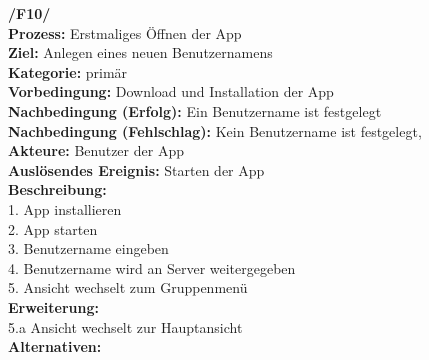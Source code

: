 \textbf{/F10/} \\
\textbf{Prozess:} Erstmaliges Öffnen der App \\
\textbf{Ziel:} Anlegen eines neuen Benutzernamens \\
\textbf{Kategorie:} primär \\
\textbf{Vorbedingung:} Download und Installation der App \\
\textbf{Nachbedingung (Erfolg):} Ein Benutzername ist festgelegt \\
\textbf{Nachbedingung (Fehlschlag):} Kein Benutzername ist festgelegt,\\
\textbf{Akteure:} Benutzer der App \\
\textbf{Auslösendes Ereignis:} Starten der App\\
\textbf{Beschreibung:} \\
1. App installieren \\
2. App starten       \\
3. Benutzername eingeben \\
4. Benutzername wird an Server weitergegeben \\
5. Ansicht wechselt zum Gruppenmenü \\
\textbf{Erweiterung:} \\
5.a Ansicht wechselt zur Hauptansicht\\
\textbf{Alternativen:}


